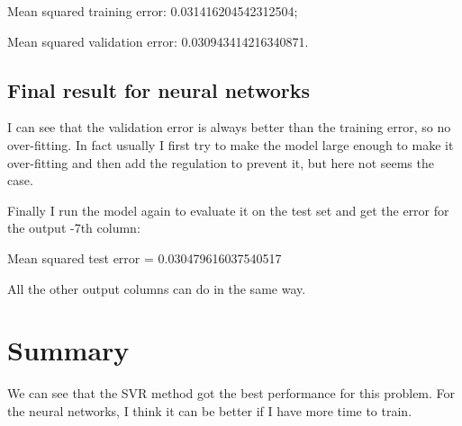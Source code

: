 \documentclass[12pt]{article}
\numberwithin{equation}{section}
\begin{document}
Mean squared training error: 0.031416204542312504;

Mean squared validation error: 0.030943414216340871.

\subsection{Final result for neural networks}
I can see that the validation error is always better than the training error, so no over-fitting. In fact usually I first try to make the model large enough to make it over-fitting and then add the regulation to prevent it, but here not seems the case.

Finally I run the model again to evaluate it on the test set and get the error for the output -7th column:

Mean squared test error = 0.030479616037540517

All the other output columns can do in the same way.

\section{Summary}
We can see that the SVR method got the best performance for this problem. For the neural networks, I think it can be better if I have more time to train. 

\renewcommand\refname{Reference}



  \clearpage
\end{document}
